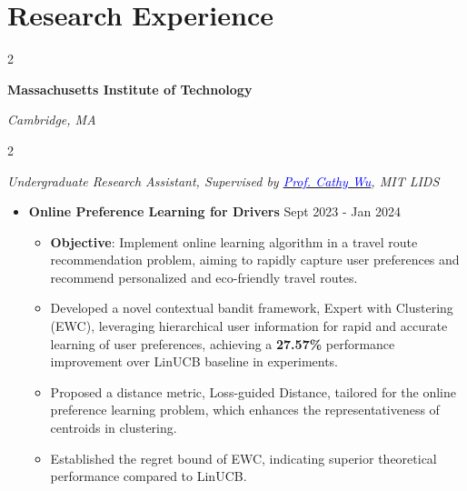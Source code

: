 \documentclass[10pt, letterpaper]{article}
\newenvironment{highlights}{
    \begin{itemize}[
        topsep=0.10 cm,
        parsep=0.10 cm,
        partopsep=0pt,
        itemsep=0pt,
        leftmargin=0 cm + 10pt
    ]
}{
    \end{itemize}
} %
\newenvironment{highlightsforbulletentries}{
    \begin{itemize}[
        topsep=0.10 cm,
        parsep=0.10 cm,
        partopsep=0pt,
        itemsep=0pt,
        leftmargin=10pt
    ]
}{
    \end{itemize}
} %
\newenvironment{twocolentry}[2][]{
    \onecolentry
    \def\secondColumn{#2}
    \setcolumnwidth{\fill, 4.5 cm}
    \begin{paracol}{2}
}{
    \switchcolumn \raggedleft \secondColumn
    \end{paracol}
    \endonecolentry
} %
\begin{document}
    \section{Research Experience}
    \begin{twocolentry}{\textit{Cambridge, MA}}
        \textbf{Massachusetts Institute of Technology}
    \end{twocolentry}
    \begin{twocolentry}{}
         \textit{Undergraduate Research Assistant, Supervised by \href{https://www.wucathy.com/}{\textcolor{blue}{Prof. Cathy Wu}}, MIT LIDS}
    \end{twocolentry}
    
    \begin{highlights}
        \item \textbf{Online Preference Learning for Drivers} \hfill Sept 2023 - Jan 2024
        \begin{highlightsforbulletentries}
            \vspace{-0.1cm}
            \item \textbf{Objective}: Implement online learning algorithm in a travel route recommendation problem, aiming to rapidly capture user preferences and recommend personalized and eco-friendly travel routes.
            \item Developed a novel contextual bandit framework, Expert with Clustering (EWC), leveraging hierarchical user information for rapid and accurate learning of user preferences, achieving a \textbf{27.57\%} performance improvement over LinUCB baseline in experiments.
            \item Proposed a distance metric, Loss-guided Distance, tailored for the online preference learning problem, which enhances the representativeness of centroids in clustering.
            \item Established the regret bound of EWC, indicating superior
theoretical performance compared to LinUCB.
        \end{highlightsforbulletentries}
        \vspace{-0.1cm}
        

\end{highlights}
\end{document}

